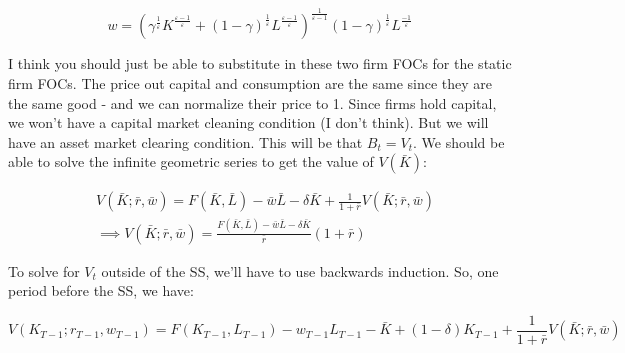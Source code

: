 \documentclass[a4paper]{article}
\begin{document}
\begin{equation}
\label{eqn:foc_l}
w= \left(\gamma^{\frac{1}{\varepsilon}}K^{\frac{\varepsilon-1}{\varepsilon}} + (1-\gamma)^{\frac{1}{\varepsilon}}L^{\frac{\varepsilon-1}{\varepsilon}}\right)^{\frac{1}{\varepsilon-1}}(1-\gamma)^{\frac{1}{\varepsilon}}L^{\frac{-1}{\varepsilon}}
\end{equation}

I think you should just be able to substitute in these two firm FOCs for the static firm FOCs.  The price out capital and consumption are the same since they are the same good - and we can normalize their price to 1.  Since firms hold capital, we won't have a capital market cleaning condition (I don't think).  But we will have an asset market clearing condition.  This will be that $B_{t}=V_{t}$.  We should be able to solve the infinite geometric series to get the value of $V(\bar{K})$:

\begin{equation}
\label{eqn:V_ss}
\begin{split}
& V(\bar{K};\bar{r},\bar{w})=F(\bar{K},\bar{L}) - \bar{w}\bar{L}  - \delta\bar{K} + \frac{1}{1+\bar{r}}V(\bar{K};\bar{r},\bar{w})\\
& \implies V(\bar{K};\bar{r},\bar{w}) = \frac{F(\bar{K},\bar{L}) - \bar{w}\bar{L}  - \delta\bar{K} }{\bar{r}} (1+\bar{r})
\end{split}
\end{equation}
 
 To solve for $V_{t}$ outside of the SS, we'll have to use backwards induction.  So, one period before the SS, we have:
 
\begin{equation}
\label{eqn:V_Tm1}
V(K_{T-1};r_{T-1},w_{T-1})=F(K_{T-1},L_{T-1}) - w_{T-1}L_{T-1}  - \bar{K} + (1- \delta)K_{T-1} + \frac{1}{1+\bar{r}}V(\bar{K};\bar{r},\bar{w})
\end{equation}
\end{document}
